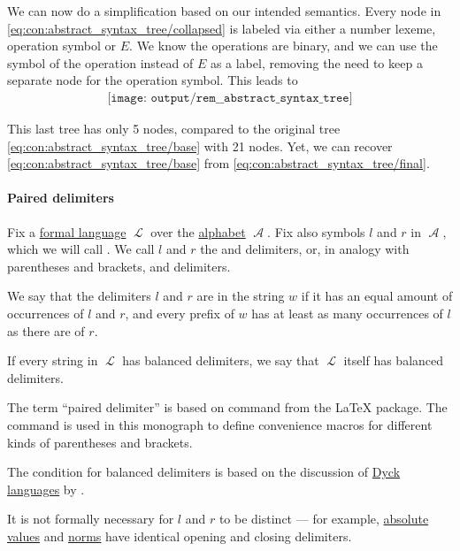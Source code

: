\begin{concept}
  We can now do a simplification based on our intended semantics. Every node in \eqref{eq:con:abstract_syntax_tree/collapsed} is labeled via either a number lexeme, operation symbol or \( E \). We know the operations are binary, and we can use the symbol of the operation instead of \( E \) as a label, removing the need to keep a separate node for the operation symbol. This leads to
  \begin{equation}\label{eq:con:abstract_syntax_tree/final}
    \begin{aligned}
      \texttt{[image: output/rem\_\_abstract\_syntax\_tree]}
    \end{aligned}
  \end{equation}

  This last tree has only 5 nodes, compared to the original tree \eqref{eq:con:abstract_syntax_tree/base} with 21 nodes. Yet, we can recover \eqref{eq:con:abstract_syntax_tree/base} from \eqref{eq:con:abstract_syntax_tree/final}.
\end{concept}

\paragraph{Paired delimiters}

\begin{definition}\label{def:paired_delimiters}\mimprovised
  Fix a \hyperref[def:formal_language/language]{formal language} \( \mscrL \) over the \hyperref[def:formal_language/alphabet]{alphabet} \( \mscrA \). Fix also symbols \( l \) and \( r \) in \( \mscrA \), which we will call . We call \( l \) and \( r \) the  and  delimiters, or, in analogy with parentheses and brackets,  and  delimiters.

  We say that the delimiters \( l \) and \( r \) are  in the string \( w \) if it has an equal amount of occurrences of \( l \) and \( r \), and every prefix of \( w \) has at least as many occurrences of \( l \) as there are of \( r \).

  If every string in \( \mscrL \) has balanced delimiters, we say that \( \mscrL \) itself has balanced delimiters.
\end{definition}
\begin{comments}
  \item The term \enquote{paired delimiter} is based on  command from the  \LaTeX{} package. The command is used in this monograph to define convenience macros for different kinds of parentheses and brackets.

  \item The condition for balanced delimiters is based on the discussion of \hyperref[def:dyck_language]{Dyck languages} by .

  \item It is not formally necessary for \( l \) and \( r \) to be distinct --- for example, \hyperref[def:absolute_value]{absolute values} and \hyperref[def:norm]{norms} have identical opening and closing delimiters.
\end{comments}

